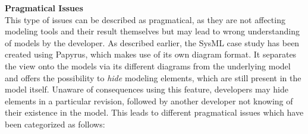 \textbf{Pragmatical Issues}\\
This type of issues can be described as pragmatical, as they are not affecting
modeling tools and their result themselves but may lead to wrong understanding
of models by the developer. As described earlier, the \ac{SysML} case study has
been created using Papyrus, which makes use of its own diagram format. It
separates the view onto the models via its different diagrams from the
underlying model and offers the possibility to \textit{hide} modeling elements, which are
still present in the model itself. Unaware of consequences using this feature,
developers may hide elements in a particular revision, followed by another
developer not knowing of their existence in the model. This leads
to different pragmatical issues which have been categorized as follows:
	
